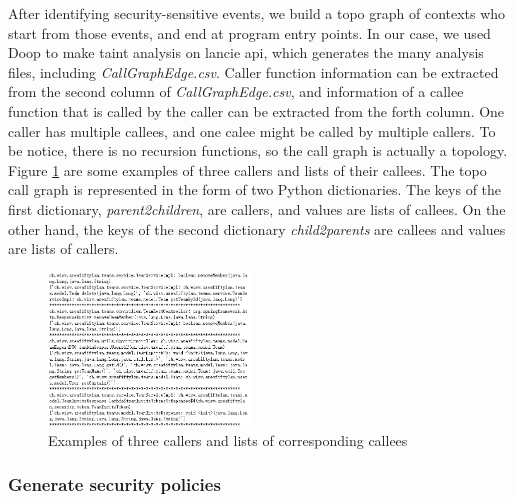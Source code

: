 After identifying security-sensitive events, we build a topo graph of contexts
who start from those events, and end at program entry points. In our case, we
used Doop to make taint analysis on lancie api, which generates the many
analysis files, including \textit{CallGraphEdge.csv}. Caller function
information can be extracted from the second column of
\textit{CallGraphEdge.csv}, and information of a callee function that is called
by the caller can be extracted from the forth column. One caller has multiple
callees, and one calee might be called by multiple callers. To be notice, there
is no recursion functions, so the call graph is actually a topology. Figure
\ref{caller2callee} are some examples of three callers and lists of their
callees. The topo call graph is represented in the form of two Python
dictionaries. The keys of the first dictionary, \textit{parent2children}, are
callers, and values are lists of callees. On the other hand, the keys of the
second dictionary \textit{child2parents} are callees and values are lists of
callers.

\begin{figure}[htp]
  \centering
  \includegraphics[width=0.48\textwidth]{img/caller2callee.png}
  \caption{Examples of three callers and lists of corresponding callees}
  \label{caller2callee}
\end{figure}

\subsubsection{Generate security policies}

